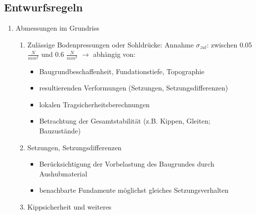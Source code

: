\begin{multicols}{2}
\begin{itemize}
		\end{itemize}
		
		
%
%		
		\subsection{Entwurfsregeln}
			
			\begin{enumerate}
				
				\item Abmessungen im Grundriss
					\begin{enumerate}
						
						\item Zulässige Bodenpressungen oder Sohldrücke: Annahme $ \sigma_{zul} $: zwischen 0.05 $ \frac{N}{mm^2} $ und 0.6 $ \frac{N}{mm^2} $ $\rightarrow$ abhängig von:
							\begin{itemize}
							
								\item Baugrundbeschaffenheit, Fundationstiefe, Topographie
								
								\item resultierenden Verformungen (Setzungen, Setzungsdifferenzen)
								
								\item lokalen Tragsicherheitsberechnungen
								
								\item Betrachtung der Gesamtstabilität (z.B. Kippen, Gleiten; Bauzustände)
																
							\end{itemize}
						
						\item Setzungen, Setzungsdifferenzen
							\begin{itemize}
								
								\item Berücksichtigung der Vorbelastung des Baugrundes durch Aushubmaterial
								
								\item benachbarte Fundamente möglichst gleiches
								Setzungsverhalten
								
							\end{itemize}
					
						\item Kippsicherheit und weiteres
							\begin{itemize}
								

\end{itemize}
\end{enumerate}
\end{enumerate}
\end{multicols}
